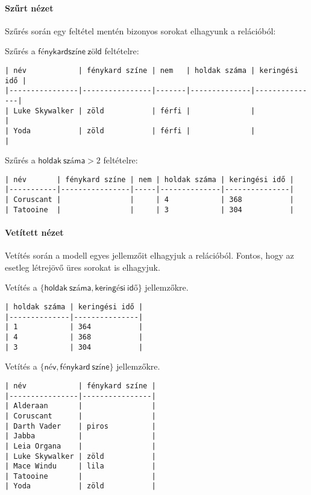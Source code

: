 \paragraph{Szűrt nézet}

Szűrés során egy feltétel mentén bizonyos sorokat elhagyunk a relációból:

Szűrés a $\mathsf{fénykard színe\: zöld}$ feltételre:

\begin{verbatim}
| név            | fénykard színe | nem   | holdak száma | keringési idő |
|----------------|----------------|-------|--------------|---------------|
| Luke Skywalker | zöld           | férfi |              |               |
| Yoda           | zöld           | férfi |              |               |
\end{verbatim}

Szűrés a $\mathsf{holdak\: száma} > 2$ feltételre:

\begin{verbatim}
| név       | fénykard színe | nem | holdak száma | keringési idő |
|-----------|----------------|-----|--------------|---------------|
| Coruscant |                |     | 4            | 368           |
| Tatooine  |                |     | 3            | 304           |
\end{verbatim}

\paragraph{Vetített nézet}

Vetítés során a modell egyes jellemzőit elhagyjuk a relációból. Fontos, hogy az esetleg létrejövő üres sorokat is elhagyjuk.

Vetítés a $\{\mathsf{holdak\: száma, keringési\: idő\}}$ jellemzőkre.

\begin{verbatim}
| holdak száma | keringési idő |
|--------------|---------------|
| 1            | 364           |
| 4            | 368           |
| 3            | 304           |
\end{verbatim}

Vetítés a $\{\mathsf{név, fénykard\: színe\}}$ jellemzőkre.

\begin{verbatim}
| név            | fénykard színe |
|----------------|----------------|
| Alderaan       |                |
| Coruscant      |                |
| Darth Vader    | piros          |
| Jabba          |                |
| Leia Organa    |                |
| Luke Skywalker | zöld           |
| Mace Windu     | lila           |
| Tatooine       |                |
| Yoda           | zöld           |
\end{verbatim}

